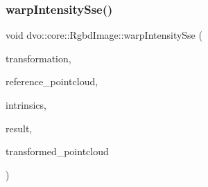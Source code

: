 \mbox{\label{structdvo_1_1core_1_1_rgbd_image_a055ec4d22938a6deb2b2fabfe083aca3}} 
\subsubsection{\texorpdfstring{warp\+Intensity\+Sse()}{warpIntensitySse()}\hspace{0.1cm}{\footnotesize\ttfamily [1/2]}}
{\footnotesize\ttfamily void dvo\+::core\+::\+Rgbd\+Image\+::warp\+Intensity\+Sse (\begin{DoxyParamCaption}\item[{const \mbox{\hyperlink{namespacedvo_1_1core_af89a8f837f3ae51ed196b7988e59e53d}{Affine\+Transform}} \&}]{transformation,  }\item[{const \mbox{\hyperlink{structdvo_1_1core_1_1_rgbd_image_a56820965eb98427d06e6733fe333cdc5}{Point\+Cloud}} \&}]{reference\+\_\+pointcloud,  }\item[{const \mbox{\hyperlink{structdvo_1_1core_1_1_intrinsic_matrix}{Intrinsic\+Matrix}} \&}]{intrinsics,  }\item[{\mbox{\hyperlink{structdvo_1_1core_1_1_rgbd_image}{Rgbd\+Image}} \&}]{result,  }\item[{\mbox{\hyperlink{structdvo_1_1core_1_1_rgbd_image_a56820965eb98427d06e6733fe333cdc5}{Point\+Cloud}} \&}]{transformed\+\_\+pointcloud }\end{DoxyParamCaption})}

\mbox{\label{structdvo_1_1core_1_1_rgbd_image_af35a385488bc48bf81ebb5cb96f58449}} 
